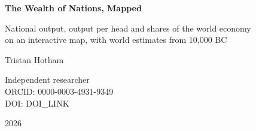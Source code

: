 \documentclass[11pt,a4paper]{article}
\begin{document}
\begin{center}
{\Large\bfseries The Wealth of Nations, Mapped\par}
\vspace{0.4em}
{\large National output, output per head and shares of the world economy\\on an interactive map, with world estimates from 10,000 BC\par}
\vspace{1.2em}
{\large Tristan Hotham\par}
\vspace{0.3em}
{\small Independent researcher\\
ORCID: 0000-0003-4931-9349\\
DOI: {{DOI_LINK}}\par}
\vspace{0.8em}
2026
\end{center}
\end{document}
